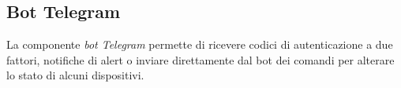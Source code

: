 \subsection{Bot Telegram}
	La componente \textit{bot Telegram} permette di ricevere codici di autenticazione a due fattori, notifiche di alert o inviare direttamente dal bot dei comandi per alterare lo stato di alcuni dispositivi. 